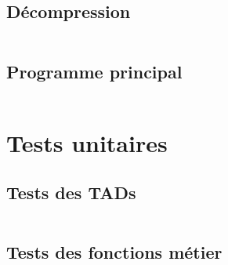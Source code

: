 \documentclass[10pt]{report}
\begin{document}
            \subsection{Décompression}
                \inputminted[breaklines]{c}{../src/decompression.c} 
            \subsection{Programme principal}
                \inputminted[breaklines]{c}{../src/main.c}
        
        \newpage
        \section{Tests unitaires}
            \subsection{Tests des TADs}
                \inputminted[breaklines]{c}{../src/testsTADs.c}
            \subsection{Tests des fonctions métier}
                \inputminted[breaklines]{c}{../src/testsFonctionsMetier.c}
                
\end{document}
